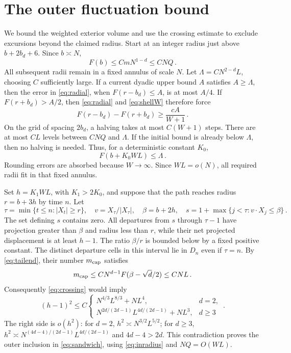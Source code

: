 \section{The outer fluctuation bound}\label{sec:outer}
We bound the weighted exterior volume and use the crossing estimate
to exclude excursions beyond the claimed radius.
Start at an integer radius just above $b+2b_d+6$. Since $b\asymp N$,
\[
 F(b)\leq CmN^{1-d}\leq CNQ\, .
\]
All subsequent radii remain in a fixed annulus of scale $N$.
Let $\Lambda=CN^{2-d}L$, choosing $C$ sufficiently large.
If a current dyadic upper bound $A$ satisfies $A\geq\Lambda$, then the
error in \eqref{eq:radial}, when $F(r-b_d)\leq A$, is at most $A/4$.
If $F(r+b_d)>A/2$, then \eqref{eq:radial} and \eqref{eq:shellW} therefore force
\[
 F(r-b_d)-F(r+b_d)\geq \frac{cA}{W+1}\, .
\]
On the grid of spacing $2b_d$, a halving takes at most $C(W+1)$
steps. There are at most $CL$ levels between $CNQ$ and
$\Lambda$. If the initial bound is already below $\Lambda$, then no
halving is needed. Thus, for a deterministic constant $K_0$,
\begin{equation}\label{eq:tailend}
 F(b+K_0WL)\leq\Lambda\, .
\end{equation}
Rounding errors are absorbed because $W\to\infty$.
Since $WL=o(N)$, all required radii fit in that fixed annulus.

Set $h=K_1WL$, with $K_1>2K_0$, and suppose that the path
reaches radius $r=b+3h$ by time $n$. Let
\[
 \tau=\min\{t\leq n:|X_t|\geq r\},\quad
 v=X_\tau/|X_\tau|,\quad \beta=b+2h,
 \quad s=1+\max\{j<\tau:v\cdot X_j\leq\beta\}\, .
\]
The set defining $s$ contains zero. All departures from $s$ through
$\tau-1$ have projection greater than $\beta$ and radius less than
$r$, while their net projected displacement is at least $h-1$.
The ratio $\beta/r$ is bounded below by a fixed positive constant.
The distinct departure cells in this interval lie in $D_n$ even
if $\tau=n$. By \eqref{eq:tailend}, their number $m_{\rm cap}$ satisfies
\[
 m_{\rm cap}\leq CN^{d-1}F(\beta-\sqrt d/2)
              \leq CNL\, .
\]
Consequently \eqref{eq:crossing} would imply
\begin{equation}\label{eq:outer-contradiction}
 (h-1)^2\leq C
 \begin{cases}
 N^{4/3}L^{8/3}+NL^4,&d=2,\\
 N^{2d/(2d-1)}L^{4d/(2d-1)}+NL^3,&d\geq3
 \end{cases}\, .
\end{equation}
The right side is $o(h^2)$: for $d=2$,
$h^2\asymp N^{3/2}L^{5/2}$; for $d\geq3$,
$h^2\asymp N^{(4d-4)/(2d-1)}L^{4d/(2d-1)}$ and
$4d-4>2d$. This contradiction proves the outer inclusion in
\eqref{eq:sandwich}, using \eqref{eq:inradius} and $NQ=O(WL)$.

